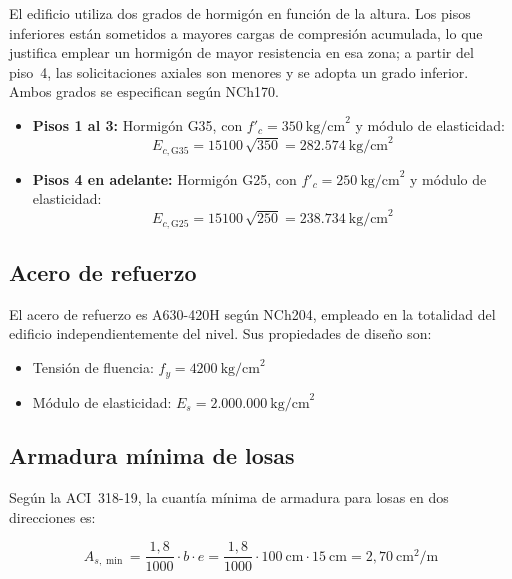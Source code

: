 El edificio utiliza dos grados de hormigón en función de la altura. Los pisos inferiores están sometidos a mayores cargas de compresión acumulada, lo que justifica emplear un hormigón de mayor resistencia en esa zona; a partir del piso~4, las solicitaciones axiales son menores y se adopta un grado inferior. Ambos grados se especifican según NCh170.
 
\begin{itemize}
    \item \textbf{Pisos 1 al 3:} Hormigón G35, con $f'_c = 350\ \text{kg/cm}^2$ y módulo de elasticidad:
    \begin{equation}
        E_{c,\text{G35}} = 15100\,\sqrt{350} = 282{.}574\ \text{kg/cm}^2
    \end{equation}
    \item \textbf{Pisos 4 en adelante:} Hormigón G25, con $f'_c = 250\ \text{kg/cm}^2$ y módulo de elasticidad:
    \begin{equation}
        E_{c,\text{G25}} = 15100\,\sqrt{250} = 238{.}734\ \text{kg/cm}^2
    \end{equation}
\end{itemize}
 
\subsection{Acero de refuerzo}
 
El acero de refuerzo es A630-420H según NCh204, empleado en la totalidad del edificio independientemente del nivel. Sus propiedades de diseño son:
 
\begin{itemize}
    \item Tensión de fluencia: $f_y = 4200\ \text{kg/cm}^2$
    \item Módulo de elasticidad: $E_s = 2{.}000{.}000\ \text{kg/cm}^2$
\end{itemize}
 
\subsection{Armadura mínima de losas}
 
Según la ACI~318-19, la cuantía mínima de armadura para losas en dos direcciones es:
 
\begin{equation}
    A_{s,\min} = \frac{1{,}8}{1000} \cdot b \cdot e
    = \frac{1{,}8}{1000} \cdot 100\ \text{cm} \cdot 15\ \text{cm}
    = 2{,}70\ \text{cm}^2/\text{m}
\end{equation}
 
